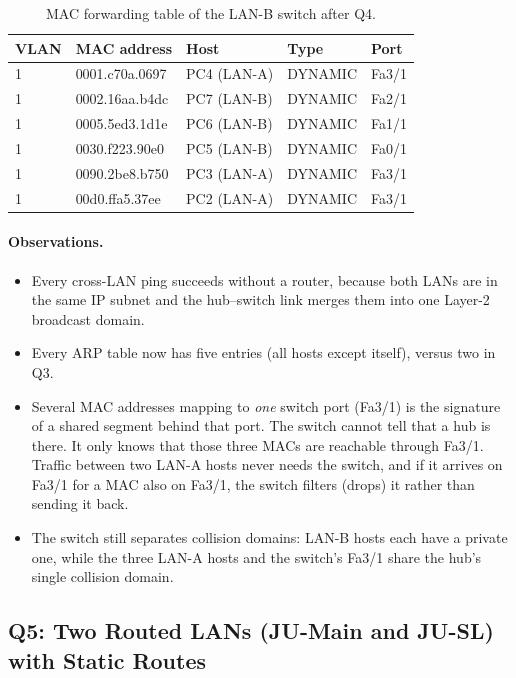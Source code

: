 \documentclass[11pt]{article}
\begin{document}
\begin{table}[H]
\centering
\begin{tabular}{lllll}
\toprule
\textbf{VLAN} & \textbf{MAC address} & \textbf{Host} & \textbf{Type} & \textbf{Port} \\
\midrule
1 & 0001.c70a.0697 & PC4 (LAN-A) & DYNAMIC & Fa3/1 \\
1 & 0002.16aa.b4dc & PC7 (LAN-B) & DYNAMIC & Fa2/1 \\
1 & 0005.5ed3.1d1e & PC6 (LAN-B) & DYNAMIC & Fa1/1 \\
1 & 0030.f223.90e0 & PC5 (LAN-B) & DYNAMIC & Fa0/1 \\
1 & 0090.2be8.b750 & PC3 (LAN-A) & DYNAMIC & Fa3/1 \\
1 & 00d0.ffa5.37ee & PC2 (LAN-A) & DYNAMIC & Fa3/1 \\
\bottomrule
\end{tabular}
\caption{MAC forwarding table of the LAN-B switch after Q4.}
\end{table}

\paragraph{Observations.}
\begin{itemize}[leftmargin=1.6em]
  \item Every cross-LAN ping succeeds without a router, because both LANs are in the same IP
  subnet and the hub--switch link merges them into one Layer-2 broadcast domain.
  \item Every ARP table now has five entries (all hosts except itself), versus two in Q3.
  \item Several MAC addresses mapping to \emph{one} switch port (Fa3/1) is the signature of
  a shared segment behind that port. The switch cannot tell that a hub is there. It only
  knows that those three MACs are reachable through Fa3/1. Traffic between two LAN-A hosts
  never needs the switch, and if it arrives on Fa3/1 for a MAC also on Fa3/1, the switch
  filters (drops) it rather than sending it back.
  \item The switch still separates collision domains: LAN-B hosts each have a private one,
  while the three LAN-A hosts and the switch's Fa3/1 share the hub's single collision domain.
\end{itemize}

\subsection{Q5: Two Routed LANs (JU-Main and JU-SL) with Static Routes}
\end{document}
